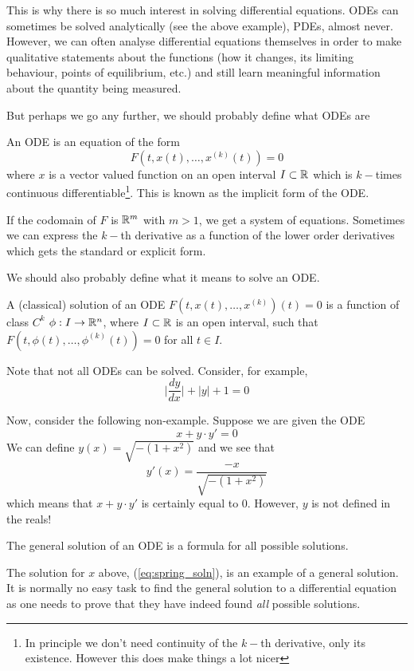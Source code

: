This is why there is so much interest in solving differential equations. ODEs can sometimes be solved analytically (see the above example), PDEs, almost never. However, we can often analyse differential equations themselves in order to make qualitative statements about the functions (how it changes, its limiting behaviour, points of equilibrium, etc.) and still learn meaningful information about the quantity being measured.

But perhaps we go any further, we should probably define what ODEs are
\begin{definition}
An ODE is an equation of the form
$$ F(t, x(t), \dots, x^{(k)}(t)) = 0 $$
where $x$ is a vector valued function on an open interval $I \subset \mathbb{R}$ which is $k-$times continuous differentiable\footnote{In principle we don't need continuity of the $k-$th derivative, only its existence. However this does make things a lot nicer}. This is known as the implicit form of the ODE.
\end{definition}
If the codomain of $F$ is $\mathbb{R}^m$ with $m > 1$, we get a system of equations. Sometimes we can express the $k-$th derivative as a function of the lower order derivatives which gets the standard or explicit form.

We should also probably define what it means to solve an ODE.
\begin{definition}
A (classical) solution of an ODE $F(t, x(t), \dots, x^{(k)})(t) = 0$ is a function of class $C^k$ $\phi: I \to \mathbb{R}^n$, where $I \subset \mathbb{R}$ is an open interval, such that $F(t, \phi(t), \dots, \phi^{(k)}(t)) = 0$ for all $t \in I$.
\end{definition}
Note that not all ODEs can be solved. Consider, for example,
$$ \bigg|\frac{dy}{dx}\bigg| + |y| + 1 = 0 $$

Now, consider the following non-example. Suppose we are given the ODE
\begin{equation*}
    x + y \cdot y' = 0
\end{equation*}
We can define $y(x) = \sqrt{-(1 + x^2)}$ and we see that 
$$ y'(x) = \frac{-x}{\sqrt{-(1 + x^2)}} $$
which means that $x + y \cdot y'$ is certainly equal to 0. However, $y$ is not defined in the reals!

\begin{definition}
The general solution of an ODE is a formula for all possible solutions.
\end{definition}
The solution for $x$ above, (\ref{eq:spring_soln}), is an example of a general solution. It is normally no easy task to find the general solution to a differential equation as one needs to prove that they have indeed found \textit{all} possible solutions.

